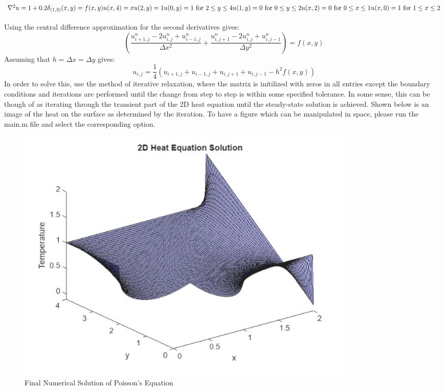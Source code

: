 \documentclass{article}
\begin{document}
\subsection*{$\nabla^2u = 1 + 0.2\delta_{(1,3)}(x,y) = f(x,y)\\u(x,4) = x\\u(2,y) = 1\\u(0,y) = 1 \text{ for } 2 \leq y \leq 4\\u(1,y) = 0 \text{ for } 0 \leq y \leq 2\\u(x,2) = 0 \text{ for } 0 \leq x \leq 1\\u(x,0) = 1 \text{ for } 1 \leq x \leq 2$}
Using the central difference approximation for the second derivatives gives:
\begin{equation}
    \left(\frac{u_{i+1,j}^n - 2u_{i,j}^n + u_{i-1,j}^n}{\Delta x^2} + \frac{u_{i,j+1}^n - 2u_{i,j}^n + u_{i,j-1}^n}{\Delta y^2}\right) = f(x,y)
\end{equation}
Assuming that $h=\Delta x=\Delta y$ gives:
\begin{equation}
    u_{i,j} = \frac{1}{4}\left(u_{i+1,j} + u_{i-1,j} + u_{i,j+1} + u_{i,j-1} - h^2f(x,y)\right)
\end{equation}
In order to solve this, use the method of iterative relaxation, where the matrix is initilized with zeros in all entries except the boundary conditions and iterations are performed until the change from step to step is within some specified tolerance. In some sense, this can be though of as iterating through the transient part of the 2D heat equation until the steady-state solution is achieved. Shown below is an image of the heat on the surface as determined by the iteration. To have a figure which can be manipulated in space, please run the main.m file and select the corresponding option.
\begin{figure}[H]
    \centering
    \includegraphics[width=0.8\textwidth]{poisson_example.jpg}
    \caption{Final Numerical Solution of Poisson's Equation}
\end{figure}
\end{document}
